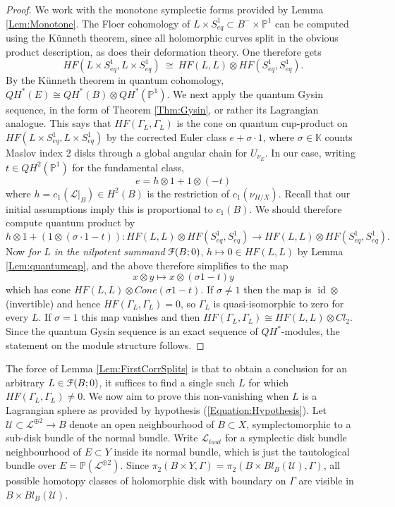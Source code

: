 \documentclass[reqno,10pt]{amsart}
\numberwithin{equation}{section}
\newcommand{\bK}{{\mathbb K}}
\newcommand{\bP}{{\mathbb P}}
\newcommand{\scrF}{\EuScript{F}}
\newcommand{\id}{\operatorname{id}}
\theoremstyle{remark}
\begin{document}
\begin{proof}
We work with the monotone symplectic forms provided by Lemma \ref{Lem:Monotone}. 
The Floer cohomology of $L\times S^1_{eq} \subset B^-\times \bP^1$ can be computed using the K\"unneth theorem, since all holomorphic curves split in the obvious product description, as does their deformation theory. One therefore gets
\[
HF(L\times S^1_{eq}, L\times S^1_{eq}) \ \cong \ HF(L,L) \otimes HF(S^1_{eq}, S^1_{eq}). 
\]
By the K\"unneth theorem in quantum cohomology, $QH^*(E) \cong QH^*(B)\otimes QH^*(\bP^1)$.
We next apply the quantum Gysin sequence, in the form of Theorem \ref{Thm:Gysin}, or rather its Lagrangian analogue.  This says that $HF(\Gamma_L,\Gamma_L)$ is the cone on quantum cup-product on $HF(L\times S^1_{eq}, L\times S^1_{eq})$ by the corrected Euler class $e+\sigma\cdot 1$, where $\sigma \in \bK$ counts Maslov index 2 disks through a global angular chain for $U_{\nu_E}$.  In our case, writing $t\in QH^2(\bP^1)$ for the fundamental class,
\[
e =  h\otimes 1 + 1\otimes (-t)
\]
where $h = c_1(\mathcal{L}|_B)\in H^2(B)$ is the restriction of $c_1(\nu_{H/X})$.  Recall that our initial assumptions imply this is proportional to $c_1(B)$. We should therefore compute quantum product by
\[
h \otimes 1 + (1 \otimes (\sigma\cdot 1 - t)): HF(L,L) \otimes HF(S^1_{eq}, S^1_{eq}) \rightarrow HF(L,L) \otimes HF(S^1_{eq}, S^1_{eq}).
\]  
Now \emph{ for $L$ in the nilpotent summand} $\scrF(B;0)$, $h \mapsto 0 \in HF(L,L)$ by Lemma \ref{Lem:quantumcap}, and the above therefore simplifies to the map
\[
x \otimes y \mapsto x \otimes (\sigma 1 -t)y
\]
which has cone $HF(L,L) \otimes Cone(\sigma 1 -t )$.     If $\sigma \neq 1$ then the map is $\id \otimes$ (invertible) and hence $HF(\Gamma_L,\Gamma_L) = 0$, so $\Gamma_L$ is quasi-isomorphic to zero for every $L$.  If $\sigma = 1$ this map vanishes and then $HF(\Gamma_L, \Gamma_L) \cong HF(L,L) \otimes Cl_2$.  Since the quantum Gysin sequence is an exact sequence of $QH^*$-modules, the statement on the module structure follows.
\end{proof}

The force of Lemma \ref{Lem:FirstCorrSplits} is that to obtain a conclusion for an arbitrary $L\in \scrF(B;0)$, it suffices to find a single such $L$ for which $HF(\Gamma_L, \Gamma_L) \neq 0$.  
 We now aim to prove this non-vanishing when $L$ is a Lagrangian sphere as provided by hypothesis (\ref{Equation:Hypothesis}).   Let $\mathcal{U} \subset \mathcal{L}^{\oplus 2} \rightarrow B$ denote an open neighbourhood of $B\subset X$, symplectomorphic to a sub-disk bundle of the normal bundle.  Write $\mathcal{L}_{taut}$ for a symplectic disk bundle neighbourhood of $E \subset Y$ inside its normal bundle,  which is just the tautological bundle over $E = \bP(\mathcal{L}^{\oplus 2})$. Since $\pi_2(B \times Y, \Gamma) = \pi_2 (B \times Bl_B(\mathcal{U}), \Gamma)$,  all possible homotopy classes of holomorphic disk with boundary on $\Gamma$ are visible in $B\times Bl_B(\mathcal{U})$.
\end{document}
